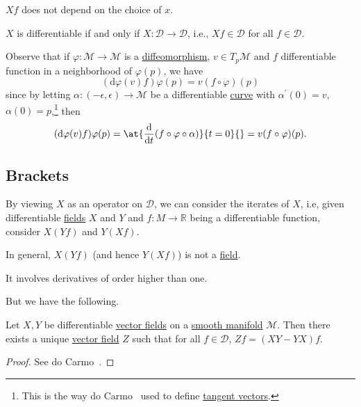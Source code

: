 \begin{remark}
	\(Xf\) does not depend on the choice of \(x\).
\end{remark}

\begin{remark}
	\(X\) is differentiable if and only if \(X\colon \mathcal{D} \to \mathcal{D} \), i.e., \(Xf\in \mathcal{D} \) for all \(f\in \mathcal{D} \).
\end{remark}

Observe that if \(\varphi \colon \mathcal{M} \to \mathcal{M} \) is a \hyperref[def:diffeomorphism]{diffeomorphism}, \(v\in T_p \mathcal{M} \)  and \(f\) differentiable function in a neighborhood of \(\varphi (p)\), we have
\[
	(\mathrm{d} \varphi (v)f)\varphi (p) = v(f\circ \varphi )(p)
\]
since by letting \(\alpha \colon (-\epsilon , \epsilon ) \to \mathcal{M} \) be a differentiable \hyperref[def:curve]{curve} with \(\alpha ^\prime (0) = v\), \(\alpha (0)= p\),\footnote{This is the way do Carmo~\cite{flaherty2013riemannian} used to define \hyperref[def:tangent-vector]{tangent vectors}.} then
\[
	(\mathrm{d} \varphi (v) f) \varphi (p) = \at{\frac{\mathrm{d}}{\mathrm{d}t} (f \circ \varphi \circ \alpha )}{t=0}{} = v(f \circ \varphi )(p).
\]

\subsection{Brackets}
By viewing \(X\) as an operator on \(\mathcal{D} \), we can consider the iterates of \(X\), i.e, given differentiable \hyperref[def:vector-field]{fields} \(X\) and \(Y\) and \(f\colon M \to \mathbb{R} \) being a differentiable function, consider \(X(Y f)\) and \(Y(X f)\).

\begin{note}
	In general, \(X(Y f)\) (and hence \(Y(X f)\)) is not a \hyperref[def:vector-field]{field}.
\end{note}
\begin{explanation}
	It involves derivatives of order higher than one.
\end{explanation}

But we have the following.

\begin{lemma}
	Let \(X, Y\) be differentiable \hyperref[def:vector-field]{vector fields} on a \hyperref[def:smooth-manifold]{smooth manifold} \(\mathcal{M} \). Then there exists a unique \hyperref[def:vector-field]{vector field} \(Z\) such that for all \(f\in \mathcal{D} \), \(Zf = (XY - YX)f\).
\end{lemma}
\begin{proof}
	See do Carmo~\cite[Chapter 0, Lemma 5.2]{flaherty2013riemannian}.
\end{proof}

